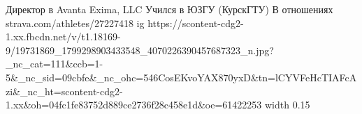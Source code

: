  
 
 
 
 

\par
Директор в Avanta Exima, LLC
Учился в ЮЗГУ (КурскГТУ)
В отношениях
strava.com/athletes/27227418
\ifcmt
  ig https://scontent-cdg2-1.xx.fbcdn.net/v/t1.18169-9/19731869_1799298903433548_4070226390457687323_n.jpg?_nc_cat=111&ccb=1-5&_nc_sid=09cbfe&_nc_ohc=546CosEKvoYAX870yxD&tn=lCYVFeHcTIAFcAzi&_nc_ht=scontent-cdg2-1.xx&oh=04fc1fe83752d889ce2736f28c458e1d&oe=61422253
  width 0.15
\fi

